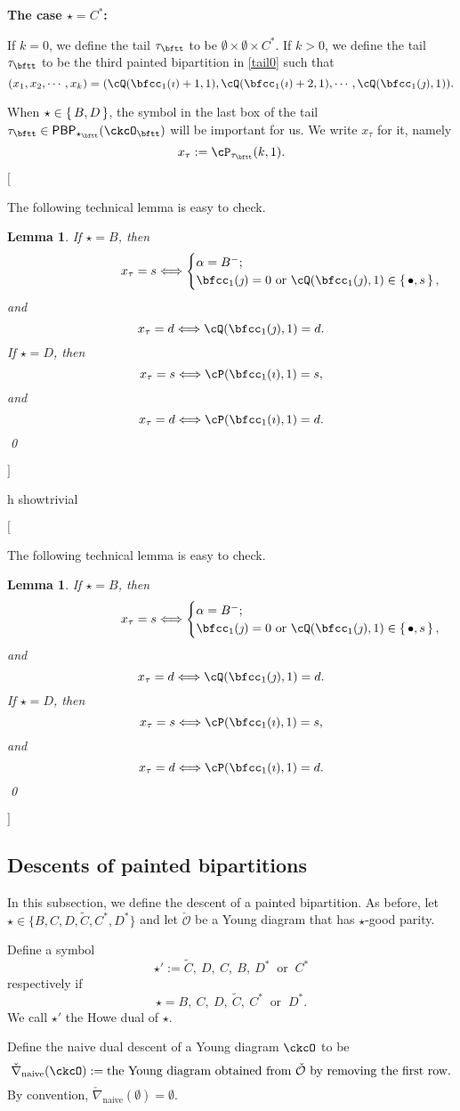\documentclass[12pt,a4paper]{amsart}
\newcommand{\trivial}[2][]{\if\relax\detokenize{#1}\relax
  {%
      \color{orange} \vspace{0em} $[$  #2 $]$
      \color{black}
  }
  \else
\ifx#1h
\ifcsname showtrivial\endcsname
{%
    \color{orange} \vspace{0em}  $[$ #2 $]$
    \color{black}
}
\fi
\else {\red Wrong argument!} \fi
\fi
}
\newcommand{\CO}{{\mathcal {O}}}
\def\tnaive{\mathrm{naive}}
\def\ckDD{{\check\DD}}
\def\DD{\nabla}
\def\ckDDn{{\ckDD}_{\tnaive}}
\numberwithin{equation}{section}
\newtheorem{lem}[thm]{Lemma}
\theoremstyle{remark}
\def\DD{\nabla}
\def\PBP{\mathsf{PBP}}
\begin{document}
{\bfseries The case $\star = C^*$:}

If $k=0$, we define the tail $\tau_{\bftt}$ to be
$\emptyset\times \emptyset \times C^{*}$.
If $k> 0$, we define the tail $\tau_\bftt$ to be the third painted bipartition in \eqref{tail0} such that
\[
  (x_1, x_2, \cdots, x_k)= (\cQ(\bfcc_{1}(\imath)+1,1),\cQ(\bfcc_{1}(\imath)+2,1),\cdots, \cQ(\bfcc_{1}(\jmath),1)).
\]


 When $\star \in \set{B,D}$, the symbol in the last box of the tail $\tau_\bftt\in \PBP_{\star_\bftt}(\ckcO_\bftt)$ will be important for us. We write $x_\tau$ for it, namely
\[
x_\tau := \cP_{\tau_\bftt}(k,1).
\]


\trivial[]{

 The following technical lemma is easy to check.

\begin{lem}\label{tailtip}
If $\star=B$, then
\[
\hspace{9em} x_\tau=s\Longleftrightarrow
\begin{cases}
  \alpha=B^-;\\
  \bfcc_1(\jmath)=0 \text{ or }\cQ(\bfcc_{1}(\jmath),1) \in\set{\bullet, s},
  \end{cases}
\]
and
\[
x_\tau=d \Longleftrightarrow
\cQ(\bfcc_{1}(\jmath),1) =d.
\]
If $\star=D$, then
\[
x_\tau=s\Longleftrightarrow \cP(\bfcc_{1}(\imath),1) = s,
\]
and
\[
x_\tau=d\Longleftrightarrow \cP(\bfcc_{1}(\imath),1) =d.
\]
\qed
\end{lem}
}

\subsection{Descents of painted bipartitions}\label{sec:comb}


In this subsection, we define the descent of a painted bipartition.
As before, let  $\star\in \{ B, C,  D, \widetilde{C},  C^*, D^*\}$ and let $\check \CO$ be a Young diagram that has $\star$-good parity.


Define a symbol
\[
\star':=\widetilde{C}, \ D, \  C, \ B, \ D^*\  \textrm{ or } \ C^*
\]
respectively if
\[
\star=B,\  C, \ D, \ \widetilde{C}, \ C^* \ \textrm{ or }\  D^*.
\]
We call $\star'$
 the Howe dual of $\star$.

 Define the naive dual descent of a Young diagram $\ckcO$ to be
 \[
  \ckDDn(\ckcO):= \textrm{the Young diagram obtained from $\check \CO$ by removing the first row}.
  \]
   By convention, $\check \nabla_{\mathrm{naive}}(\emptyset)=\emptyset$.
\end{document}
